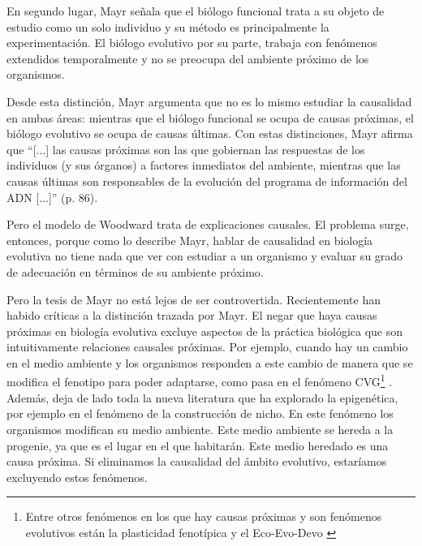 {En segundo lugar, Mayr señala que el biólogo funcional trata a su objeto de estudio como un solo individuo y su método es principalmente la experimentación. El biólogo evolutivo por su parte, trabaja con fenómenos extendidos temporalmente y no se preocupa del ambiente próximo de los organismos.

Desde esta distinción, Mayr argumenta que no es lo mismo estudiar la causalidad en ambas áreas: mientras que el biólogo funcional se ocupa de causas próximas, el biólogo evolutivo se ocupa de causas últimas. Con estas distinciones, Mayr afirma que ``[...] las causas próximas son las que gobiernan las respuestas de los individuos (y sus órganos) a factores inmediatos del ambiente, mientras que las causas últimas son responsables de la evolución del programa de información del ADN [...]'' (p. 86).


Pero el modelo de Woodward trata de explicaciones causales. El problema surge, entonces, porque como lo describe Mayr, hablar de causalidad en biología evolutiva no tiene nada que ver con estudiar a un organismo y evaluar su grado de adecuación en términos de su ambiente próximo.

Pero la tesis de Mayr no está lejos de ser controvertida. Recientemente han habido críticas a la distinción trazada por Mayr. El negar que haya causas próximas en biología evolutiva excluye aspectos de la práctica biológica que son intuitivamente relaciones causales próximas. Por ejemplo, cuando hay un cambio en el medio ambiente y los organismos responden a este cambio de manera que se modifica el fenotipo para poder adaptarse, como pasa en el fenómeno CVG\footnote{Entre otros fenómenos en los que hay causas próximas y son fenómenos evolutivos están la plasticidad fenotípica \cite{WESTEBERHARD20082701} y el Eco-Evo-Devo \cite{PfenningEco-Evo-Devo}} \cite{CVG}. Además, deja de lado toda la nueva literatura que ha explorado la epigenética, por ejemplo en el fenómeno de la construcción de nicho. En este fenómeno los organismos modifican su medio ambiente. Este medio ambiente se hereda a la progenie, ya que es el lugar en el que habitarán. Este medio heredado es una causa próxima. Si eliminamos la causalidad del ámbito evolutivo, estaríamos excluyendo estos fenómenos.

}
